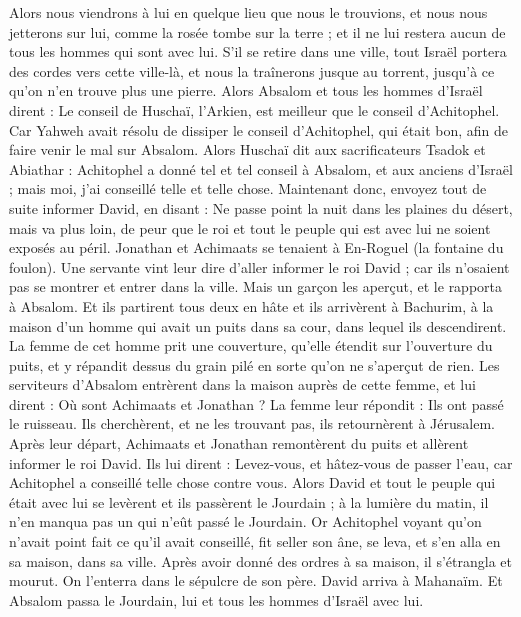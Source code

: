 \begin{multicols}{2}
Alors nous viendrons à lui en quelque lieu que nous le trouvions, et nous nous jetterons sur lui, comme la rosée tombe sur la terre ; et il ne lui restera aucun de tous les hommes qui sont avec lui.
S'il se retire dans une ville, tout Israël portera des cordes vers cette ville-là, et nous la traînerons jusque au torrent, jusqu'à ce qu'on n'en trouve plus une pierre.
Alors Absalom et tous les hommes d'Israël dirent : Le conseil de Huschaï, l'Arkien, est meilleur que le conseil d’Achitophel. Car Yahweh avait résolu de dissiper le conseil d’Achitophel, qui était bon, afin de faire venir le mal sur Absalom.
Alors Huschaï dit aux sacrificateurs Tsadok et Abiathar : Achitophel a donné tel et tel conseil à Absalom, et aux anciens d'Israël ; mais moi, j'ai conseillé telle et telle chose.
Maintenant donc, envoyez tout de suite informer David, en disant : Ne passe point la nuit dans les plaines du désert, mais va plus loin, de peur que le roi et tout le peuple qui est avec lui ne soient exposés au péril.
Jonathan et Achimaats se tenaient à En-Roguel (la fontaine du foulon). Une servante vint leur dire d'aller informer le roi David ; car ils n'osaient pas se montrer et entrer dans la ville.
Mais un garçon les aperçut, et le rapporta à Absalom. Et ils partirent tous deux en hâte et ils arrivèrent à Bachurim, à la maison d'un homme qui avait un puits dans sa cour, dans lequel ils descendirent.
La femme de cet homme prit une couverture, qu’elle étendit sur l'ouverture du puits, et y répandit dessus du grain pilé en sorte qu'on ne s’aperçut de rien.
Les serviteurs d'Absalom entrèrent dans la maison auprès de cette femme, et lui dirent : Où sont Achimaats et Jonathan ? La femme leur répondit : Ils ont passé le ruisseau. Ils cherchèrent, et ne les trouvant pas, ils retournèrent à Jérusalem.
Après leur départ, Achimaats et Jonathan remontèrent du puits et allèrent informer le roi David. Ils lui dirent : Levez-vous, et hâtez-vous de passer l'eau, car Achitophel a conseillé telle chose contre vous.
Alors David et tout le peuple qui était avec lui se levèrent et ils passèrent le Jourdain ; à la lumière du matin, il n'en manqua pas un qui n'eût passé le Jourdain.
Or Achitophel voyant qu'on n'avait point fait ce qu'il avait conseillé, fit seller son âne, se leva, et s'en alla en sa maison, dans sa ville. Après avoir donné des ordres à sa maison, il s'étrangla et mourut. On l'enterra dans le sépulcre de son père.
David arriva à Mahanaïm. Et Absalom passa le Jourdain, lui et tous les hommes d'Israël avec lui.

\end{multicols}

